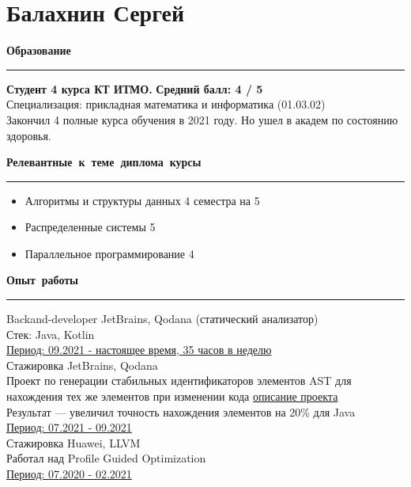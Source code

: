 \documentclass[12pt, a4paper]{report}
\author{Балахнин Сергей}
\begin{document}
    \section*{Балахнин Сергей}

    \par\hbox{\large\textbf{Образование}}\kern5pt\hrule\kern5pt

    \textbf{Студент 4 курса КТ ИТМО.}
    \hfill
    \textbf{ Средний балл: 4 / 5} \\
    Специализация: прикладная математика и информатика (01.03.02) \\
    Закончил 4 полные курса обучения в 2021 году. Но ушел в академ по состоянию здоровья.\\

    \par\hbox{\large\textbf{Релевантные к теме диплома курсы}}\kern5pt\hrule\kern5pt
    \begin{itemize}
        \item Алгоритмы и структуры данных \hfill 4 семестра на 5
        \item Распределенные системы \hfill 5
        \item Параллельное программирование \hfill 4
    \end{itemize}

    \par\hbox{\large\textbf{Опыт работы}}\kern3pt\hrule\kern10pt

    Backand-developer JetBrains, Qodana (статический анализатор) \\
    Стек: Java, Kotlin \\
    \underline{Период: 09.2021 - настоящее время, 35 часов в неделю} \\

    Стажировка JetBrains, Qodana \\
    Проект по генерации стабильных идентификаторов элементов AST для нахождения тех же элементов при изменении кода \href{https://internship.jetbrains.com/projects/871/}{описание проекта} \\
    Результат — увеличил точность нахождения элементов на 20\% для Java \\
    \underline{Период: 07.2021 - 09.2021} \\

    Стажировка Huawei, LLVM \\
    Работал над Profile Guided Optimization \\
    \underline{Период: 07.2020 - 02.2021} \\
\end{document}
